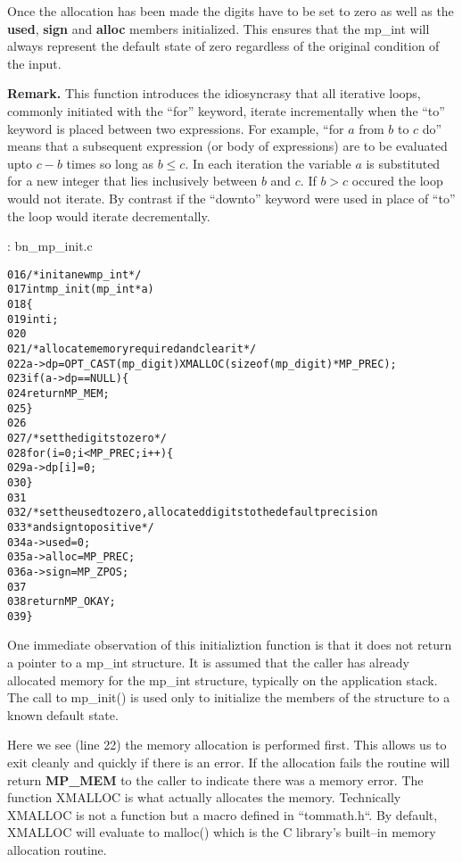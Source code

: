 \documentclass[b5paper]{book}
\begin{document}
Once the allocation has been made the digits have to be set to zero as well as the \textbf{used}, \textbf{sign} and
\textbf{alloc} members initialized.  This ensures that the mp\_int will always represent the default state of zero regardless
of the original condition of the input.

\textbf{Remark.}
This function introduces the idiosyncrasy that all iterative loops, commonly initiated with the ``for'' keyword, iterate incrementally
when the ``to'' keyword is placed between two expressions.  For example, ``for $a$ from $b$ to $c$ do'' means that
a subsequent expression (or body of expressions) are to be evaluated upto $c - b$ times so long as $b \le c$.  In each
iteration the variable $a$ is substituted for a new integer that lies inclusively between $b$ and $c$.  If $b > c$ occured
the loop would not iterate.  By contrast if the ``downto'' keyword were used in place of ``to'' the loop would iterate 
decrementally.

\vspace{+3mm}\begin{small}
\hspace{-5.1mm}{\bf File}: bn\_mp\_init.c
\vspace{-3mm}
\begin{alltt}
016   /* init a new mp_int */
017   int mp_init (mp_int * a)
018   \{
019     int i;
020   
021     /* allocate memory required and clear it */
022     a->dp = OPT_CAST(mp_digit) XMALLOC (sizeof (mp_digit) * MP_PREC);
023     if (a->dp == NULL) \{
024       return MP_MEM;
025     \}
026   
027     /* set the digits to zero */
028     for (i = 0; i < MP_PREC; i++) \{
029         a->dp[i] = 0;
030     \}
031   
032     /* set the used to zero, allocated digits to the default precision
033      * and sign to positive */
034     a->used  = 0;
035     a->alloc = MP_PREC;
036     a->sign  = MP_ZPOS;
037   
038     return MP_OKAY;
039   \}
\end{alltt}
\end{small}

One immediate observation of this initializtion function is that it does not return a pointer to a mp\_int structure.  It 
is assumed that the caller has already allocated memory for the mp\_int structure, typically on the application stack.  The 
call to mp\_init() is used only to initialize the members of the structure to a known default state.  

Here we see (line 22) the memory allocation is performed first.  This allows us to exit cleanly and quickly
if there is an error.  If the allocation fails the routine will return \textbf{MP\_MEM} to the caller to indicate there
was a memory error.  The function XMALLOC is what actually allocates the memory.  Technically XMALLOC is not a function
but a macro defined in ``tommath.h``.  By default, XMALLOC will evaluate to malloc() which is the C library's built--in
memory allocation routine.
\end{document}
